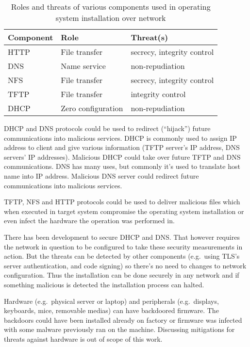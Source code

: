 \begin{table}[!ht]
  \def\arraystretch{1.1}%
  \begin{center}
    \label{tab:threats_table}
    \begin{tabular}{| l | l | l |}
      \hline
      Component   & Role               & Threat(s)                  \\
      \hline
      HTTP        & File transfer      & secrecy, integrity control \\
      DNS         & Name service       & non-repudiation             \\
      NFS         & File transfer      & secrecy, integrity control \\
      TFTP        & File transfer      & integrity control          \\
      DHCP        & Zero configuration & non-repudiation             \\
      \hline
    \end{tabular}
    \caption{Roles and threats of various components used in operating
      system installation over network}
  \end{center}
\end{table}

DHCP and DNS protocols could be used to redirect (``hijack'') future
communications into malicious services. DHCP is commonly used to
assign IP address to client and give various information (TFTP
server's IP address, DNS servers' IP addresses). Malicious DHCP could
take over future TFTP and DNS communications. DNS has many uses, but
commonly it's used to translate host name into IP address. Malicious
DNS server could redirect future communications into malicious
services.

TFTP, NFS and HTTP protocols could be used to deliver malicious files
which when executed in target system compromise the operating system
installation or even infect the hardware the operation was performed
in.

There has been development to secure DHCP and DNS\@. That however
requires the network in question to be configured to take these
security measurements in action. But the threats can be detected by
other components (e.g.\ using TLS's server authentication, and code
signing) so there's no need to changes to network configuration. Thus
the installation can be done securely in any network and if something
malicious is detected the installation process can halted.

Hardware (e.g.\ physical server or laptop) and peripherals
(e.g.\ displays, keyboards, mice, removable medias) can have backdoored
firmware. The backdoors could have been installed already on factory
or firmware was infected with some malware previously ran on the
machine. Discussing mitigations for threats against hardware is out of
scope of this work.


